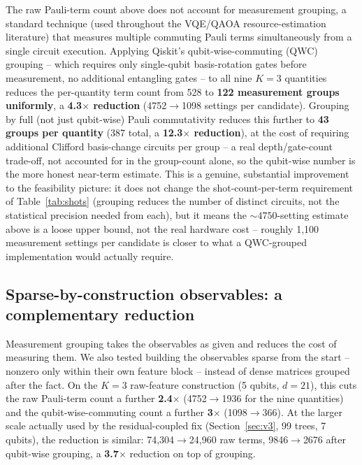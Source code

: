 \documentclass[conference]{IEEEtran}
\begin{document}
The raw Pauli-term count above does not account for measurement grouping, a standard technique (used throughout the VQE/QAOA resource-estimation literature) that measures multiple commuting Pauli terms simultaneously from a single circuit execution. Applying Qiskit's qubit-wise-commuting (QWC) grouping -- which requires only single-qubit basis-rotation gates before measurement, no additional entangling gates -- to all nine $K{=}3$ quantities reduces the per-quantity term count from 528 to \textbf{122 measurement groups uniformly}, a \textbf{4.3$\times$ reduction} (4752$\to$1098 settings per candidate). Grouping by full (not just qubit-wise) Pauli commutativity reduces this further to \textbf{43 groups per quantity} (387 total, a \textbf{12.3$\times$ reduction}), at the cost of requiring additional Clifford basis-change circuits per group -- a real depth/gate-count trade-off, not accounted for in the group-count alone, so the qubit-wise number is the more honest near-term estimate. This is a genuine, substantial improvement to the feasibility picture: it does not change the shot-count-per-term requirement of Table~\ref{tab:shots} (grouping reduces the number of distinct circuits, not the statistical precision needed from each), but it means the $\sim\!4750$-setting estimate above is a loose upper bound, not the real hardware cost -- roughly 1{,}100 measurement settings per candidate is closer to what a QWC-grouped implementation would actually require.

\subsection{Sparse-by-construction observables: a complementary reduction}\label{sec:sparse}

Measurement grouping takes the observables as given and reduces the cost of measuring them. We also tested building the observables sparse from the start -- nonzero only within their own feature block -- instead of dense matrices grouped after the fact. On the $K{=}3$ raw-feature construction (5 qubits, $d{=}21$), this cuts the raw Pauli-term count a further \textbf{2.4$\times$} (4752$\to$1936 for the nine quantities) and the qubit-wise-commuting count a further \textbf{3$\times$} (1098$\to$366). At the larger scale actually used by the residual-coupled fix (Section~\ref{sec:v3}, 99 trees, 7 qubits), the reduction is similar: 74{,}304$\to$24{,}960 raw terms, 9846$\to$2676 after qubit-wise grouping, a \textbf{3.7$\times$} reduction on top of grouping.
\end{document}

